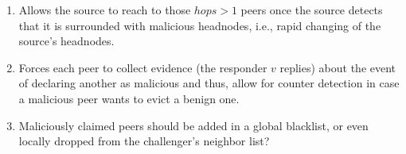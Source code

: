 \begin{enumerate}
 \item Allows the source to reach to those $hops>1$ peers once the source detects that it is surrounded with malicious headnodes, i.e., rapid changing of the source's headnodes.
 \item Forces each peer to collect evidence (the responder $v$ replies) about the event of declaring another as malicious and thus, allow for counter detection in case a malicious peer wants to evict a benign one.
 \item Maliciously claimed peers should be added in a global blacklist, or even locally dropped from the challenger's neighbor list?
\end{enumerate}

